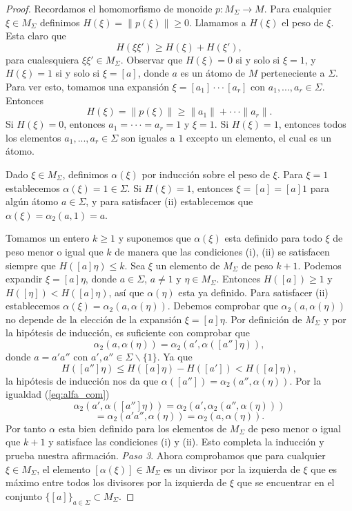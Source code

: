 \documentclass[12pt]{book}
\theoremstyle{definition}
\providecommand{\norm}[1]{\lVert#1\rVert}
\begin{document}
\begin{proof}
Recordamos el homomorfismo de monoide $p:M_\Sigma\rightarrow M$. Para cualquier $\xi\in M_\Sigma$ definimos $H(\xi)=\norm{p(\xi)}\geq 0$. Llamamos a $H(\xi)$ el peso de $\xi$. Esta claro que
$$H(\xi\xi')\geq H(\xi)+H(\xi'),$$
para cualesquiera $\xi\xi'\in M_\Sigma$. Observar que $H(\xi)=0$ si y solo si $\xi=1$, y $H(\xi)=1$ si y solo si $\xi=[a]$, donde $a$ es un átomo de $M$ perteneciente a $\Sigma$. Para ver esto, tomamos una expansión $\xi=[a_1]\cdot\cdot\cdot[a_r]$ con $a_1,...,a_r\in\Sigma$. Entonces
$$H(\xi)=\norm{p(\xi)}\geq\norm{a_1}+\cdot\cdot\cdot\norm{a_r}.$$
Si $H(\xi)=0$, entonces $a_1=\cdot\cdot\cdot=a_r=1$ y $\xi=1$. Si $H(\xi)=1$, entonces todos los elementos $a_1,...,a_r\in\Sigma$ son iguales a $1$ excepto un elemento, el cual es un átomo.

Dado $\xi\in M_\Sigma$, definimos $\alpha(\xi)$ por inducción sobre el peso de $\xi$. Para $\xi=1$ establecemos $\alpha(\xi)=1\in\Sigma$. Si $H(\xi)=1$, entonces $\xi=[a]=[a]1$ para algún átomo $a\in\Sigma$, y para satisfacer (ii) establecemos que $\alpha(\xi)=\alpha_2(a,1)=a$.

Tomamos un entero $k\geq 1$ y suponemos que $\alpha(\xi)$ esta definido para todo $\xi$ de peso menor o igual que $k$ de manera que las condiciones (i), (ii) se satisfacen siempre que $H([a]\eta)\leq k$. Sea $\xi$ un elemento de $M_\Sigma$ de peso $k+1$. Podemos expandir $\xi=[a]\eta$, donde $a\in\Sigma$, $a\neq 1$ y $\eta\in M_\Sigma$. Entonces $H([a])\geq 1$ y $H([\eta]) < H([a]\eta)$, así que $\alpha(\eta)$ esta ya definido. Para satisfacer (ii) establecemos $\alpha(\xi)=\alpha_2(a,\alpha(\eta))$. Debemos comprobar que $\alpha_2(a,\alpha(\eta))$ no depende de la elección de la expansión $\xi=[a]\eta$. Por definición de $M_\Sigma$ y por la hipótesis de inducción, es suficiente con comprobar que 
$$\alpha_2(a,\alpha(\eta))=\alpha_2(a',\alpha([a'']\eta)),$$
donde $a=a'a''$ con $a',a''\in \Sigma \backslash\{1\}$. Ya que
$$H([a'']\eta)\leq H([a]\eta) - H([a'])<H([a]\eta),$$
la hipótesis de inducción nos da que $\alpha([a''])=\alpha_2(a'',\alpha(\eta))$. Por la igualdad (\ref{eq:alfa_com}) 
$$\alpha_2(a',\alpha([a'']\eta))=\alpha_2(a',\alpha_2(a'',\alpha(\eta)))$$
$$=\alpha_2(a'a'',\alpha(\eta))=\alpha_2(a,\alpha(\eta)).$$
Por tanto $\alpha$ esta bien definido para los elementos de $M_\Sigma$ de peso menor o igual que $k +1$ y satisface las condiciones (i) y (ii). Esto completa la inducción y prueba nuestra afirmación.
\newline
\newline
\textit{Paso 3}. Ahora comprobamos que para cualquier $\xi\in M_\Sigma$, el elemento $[\alpha(\xi)]\in M_\Sigma$ es un divisor por la izquierda de $\xi$ que es máximo entre todos los divisores por la izquierda de $\xi$ que se encuentrar en el conjunto $\{[a]\}_{a\in\Sigma}\subset M_\Sigma$.


\end{proof}
\end{document}
